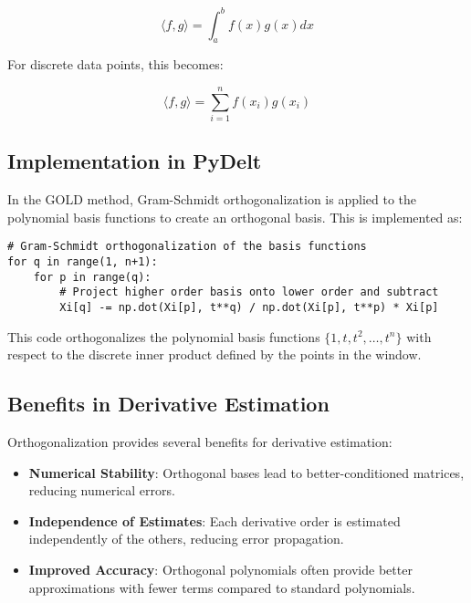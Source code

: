 \documentclass{article}
\begin{document}
\begin{equation}
\langle f, g \rangle = \int_a^b f(x)g(x) dx
\end{equation}

For discrete data points, this becomes:

\begin{equation}
\langle f, g \rangle = \sum_{i=1}^n f(x_i)g(x_i)
\end{equation}

\subsection{Implementation in PyDelt}

In the GOLD method, Gram-Schmidt orthogonalization is applied to the polynomial basis functions to create an orthogonal basis. This is implemented as:

\begin{verbatim}
# Gram-Schmidt orthogonalization of the basis functions
for q in range(1, n+1):
    for p in range(q):
        # Project higher order basis onto lower order and subtract
        Xi[q] -= np.dot(Xi[p], t**q) / np.dot(Xi[p], t**p) * Xi[p]
\end{verbatim}

This code orthogonalizes the polynomial basis functions $\{1, t, t^2, \ldots, t^n\}$ with respect to the discrete inner product defined by the points in the window.

\subsection{Benefits in Derivative Estimation}

Orthogonalization provides several benefits for derivative estimation:

\begin{itemize}
    \item \textbf{Numerical Stability}: Orthogonal bases lead to better-conditioned matrices, reducing numerical errors.
    
    \item \textbf{Independence of Estimates}: Each derivative order is estimated independently of the others, reducing error propagation.
    
    \item \textbf{Improved Accuracy}: Orthogonal polynomials often provide better approximations with fewer terms compared to standard polynomials.
\end{itemize}
\end{document}
